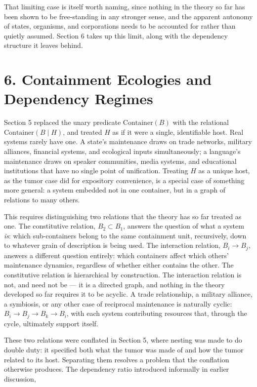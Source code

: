 \documentclass[11pt]{article}
\theoremstyle{plain}
\begin{document}
That limiting case is itself worth naming, since nothing in the theory so far has been shown to be free-standing in any stronger sense, and the apparent autonomy of states, organisms, and corporations needs to be accounted for rather than quietly assumed. Section 6 takes up this limit, along with the dependency structure it leaves behind.

\section*{6. Containment Ecologies and Dependency Regimes}

Section 5 replaced the unary predicate \(\mathrm{Container}(B)\) with the relational \(\mathrm{Container}(B \mid H)\), and treated \(H\) as if it were a single, identifiable host. Real systems rarely have one. A state's maintenance draws on trade networks, military alliances, financial systems, and ecological inputs simultaneously; a language's maintenance draws on speaker communities, media systems, and educational institutions that have no single point of unification. Treating \(H\) as a unique host, as the tumor case did for expository convenience, is a special case of something more general: a system embedded not in one container, but in a graph of relations to many others.

This requires distinguishing two relations that the theory has so far treated as one. The constitutive relation, \(B_2 \subset B_1\), answers the question of what a system \emph{is}: which sub-containers belong to the same containment unit, recursively, down to whatever grain of description is being used. The interaction relation, \(B_i \to B_j\), answers a different question entirely: which containers affect which others' maintenance dynamics, regardless of whether either contains the other. The constitutive relation is hierarchical by construction. The interaction relation is not, and need not be --- it is a directed graph, and nothing in the theory developed so far requires it to be acyclic. A trade relationship, a military alliance, a symbiosis, or any other case of reciprocal maintenance is naturally cyclic: \(B_i \to B_j \to B_k \to B_i\), with each system contributing resources that, through the cycle, ultimately support itself.

These two relations were conflated in Section 5, where nesting was made to do double duty: it specified both what the tumor was made of and how the tumor related to its host. Separating them resolves a problem that the conflation otherwise produces. The dependency ratio introduced informally in earlier discussion,
\end{document}
